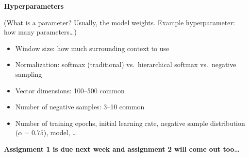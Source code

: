 \documentclass{beamer}
\newcommand{\placard}[1]{
  \begin{frame}
    \begin{center}
      \huge
      \textbf{#1}
    \end{center}
  \end{frame}
}
\newcommand{\pagestepalt}[2]{
  \begin{frame}[t]
    \begin{minipage}[t][0.26\textheight][t]{\textwidth}
      \begin{center}
        \huge
        \textbf{#1}
      \end{center}
    \end{minipage}
    
    \begin{minipage}[t][0.7\textheight][c]{\textwidth}
      #2
    \end{minipage}
  \end{frame}
}
\begin{document}
\pagestepalt{Hyperparameters}{
  (What is a parameter? Usually, the model weights. Example hyperparameter: how many parameters\ldots)\pause
\begin{itemize}
	\item Window size: how much surrounding context to use
	\item Normalization: softmax (traditional) vs.\ hierarchical softmax vs.\ negative sampling
	\item Vector dimensions: 100--500 common
	\item Number of negative samples: 3--10 common
	\item Number of training epochs, initial learning rate, negative sample distribution ($\alpha = 0.75$), model, \ldots
\end{itemize}
}

\placard{Assignment 1 is due next week and assignment 2 will come out too\ldots}
\end{document}
